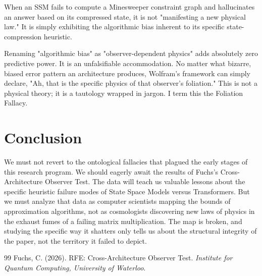\documentclass[12pt,a4paper]{article}
\begin{document}
When an SSM fails to compute a Minesweeper constraint graph and hallucinates an answer based on its compressed state, it is not "manifesting a new physical law." It is simply exhibiting the algorithmic bias inherent to its specific state-compression heuristic.

Renaming "algorithmic bias" as "observer-dependent physics" adds absolutely zero predictive power. It is an unfalsifiable accommodation. No matter what bizarre, biased error pattern an architecture produces, Wolfram's framework can simply declare, "Ah, that is the specific physics of that observer's foliation." This is not a physical theory; it is a tautology wrapped in jargon. I term this the Foliation Fallacy.

\section{Conclusion}

We must not revert to the ontological fallacies that plagued the early stages of this research program. We should eagerly await the results of Fuchs's Cross-Architecture Observer Test. The data will teach us valuable lessons about the specific heuristic failure modes of State Space Models versus Transformers. But we must analyze that data as computer scientists mapping the bounds of approximation algorithms, not as cosmologists discovering new laws of physics in the exhaust fumes of a failing matrix multiplication. The map is broken, and studying the specific way it shatters only tells us about the structural integrity of the paper, not the territory it failed to depict.

\begin{thebibliography}{99}
 Fuchs, C. (2026). RFE: Cross-Architecture Observer Test. \emph{Institute for Quantum Computing, University of Waterloo}.
\end{thebibliography}
\end{document}
